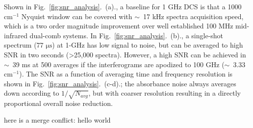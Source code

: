 \documentclass{optica-article}
\begin{document}
Shown in Fig.~\ref{fig:snr_analysis}.~(a)., a baseline for 1 GHz DCS is that a 1000 $\mathrm{cm^{-1}}$ Nyquist window can be covered with $\sim$~17 kHz spectra acquisition speed, which is a two order magnitude improvement over well established 100 MHz mid-infrared dual-comb systems. In Fig.~\ref{fig:snr_analysis}.~(b)., a single-shot spectrum (77 $\mathrm{\mu s}$) at 1-GHz has low signal to noise, but can be averaged to high SNR in two seconds (>25,000 spectra). However, a high SNR can be achieved in $\sim$~39 ms at 500 averages if the interferograms are apodized to 100 GHz ($\sim$~3.33 $\mathrm{cm^{-1}}$).  The SNR as a function of averaging time and frequency resolution is shown in Fig.~\ref{fig:snr_analysis}.~(c-d).; the absorbance noise always averages down according to $1/\sqrt{N_{avg}}$, but with coarser resolution resulting in a directly proportional overall noise reduction. 


here is a merge conflict: hello world


\end{document}
